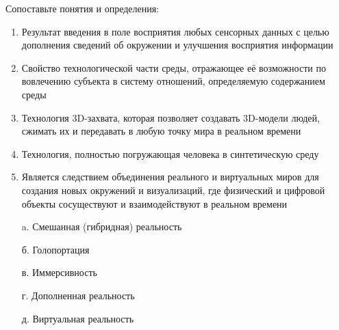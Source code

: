
Сопоставьте понятия и определения:

\begin{enumerate}
    \item Результат введения в поле восприятия любых сенсорных данных с целью дополнения сведений об окружении и улучшения восприятия информации
    \item Свойство технологической части среды, отражающее её возможности по вовлечению субъекта в систему отношений, определяемую содержанием среды
    \item Технология 3D-захвата, которая позволяет создавать 3D-модели людей, сжимать их и передавать в любую точку мира в реальном времени
    \item Технология, полностью погружающая человека в синтетическую среду
    \item Является следствием объединения реального и виртуальных миров для создания новых окружений и визуализаций, где физический и цифровой объекты сосуществуют и взаимодействуют в реальном времени
\end{enumerate}

\begin{enumerate}
    \item[a.] Смешанная (гибридная) реальность
    \item[б.] Голопортация
    \item[в.] Иммерсивность
    \item[г.] Дополненная реальность
    \item[д.] Виртуальная реальность
\end{enumerate}

